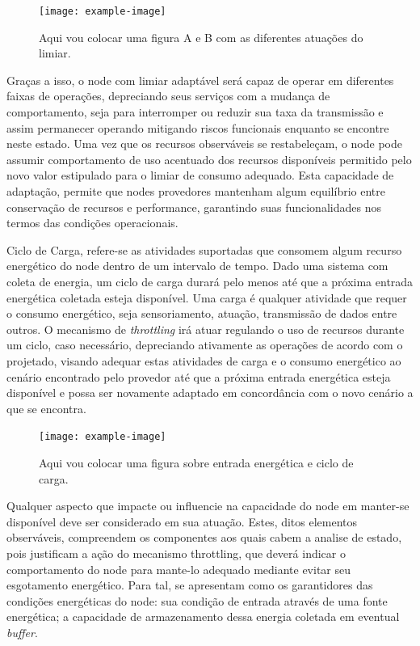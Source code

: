 \begin{itemize}
    \begin{figure}[h]
    	\centering
    	\texttt{[image: example-image]} 
    	\caption{Aqui vou colocar uma figura A e B com as diferentes atuações do limiar.}
    \end{figure}
    
    Graças a isso, o node com limiar adaptável será capaz de operar em diferentes faixas de operações, depreciando seus serviços com a mudança de comportamento, seja para interromper ou reduzir sua taxa da transmissão e assim permanecer operando mitigando riscos funcionais enquanto se encontre neste estado. Uma vez que os recursos observáveis se restabeleçam, o node pode assumir comportamento de uso acentuado dos recursos disponíveis permitido pelo novo valor estipulado para o limiar de consumo adequado. Esta capacidade de adaptação, permite que nodes provedores mantenham algum equilíbrio entre conservação de recursos e performance, garantindo suas funcionalidades nos termos das condições operacionais.
    
      
 
    
\end{itemize}


Ciclo de Carga, refere-se as atividades suportadas que consomem algum recurso energético do node dentro de um intervalo de tempo. Dado uma sistema com coleta de energia, um ciclo de carga durará pelo menos até que a próxima entrada energética coletada esteja disponível.  Uma carga é qualquer atividade que requer o consumo energético, seja sensoriamento, atuação, transmissão de dados entre outros. O mecanismo de \textit{throttling} irá atuar regulando o uso de recursos durante um ciclo, caso necessário, depreciando ativamente as operações de acordo com o projetado, visando adequar estas atividades de carga e o consumo energético ao cenário encontrado pelo provedor até que a próxima entrada energética esteja disponível e possa ser novamente adaptado em concordância com o novo cenário a que se encontra.

\begin{figure}[h]
	\centering
	\noindent\texttt{[image: example-image]} 
	\caption{Aqui vou colocar uma figura sobre entrada energética e ciclo de carga.}
\end{figure}

Qualquer aspecto que impacte ou influencie na capacidade do node em manter-se disponível deve ser considerado em sua atuação. Estes, ditos elementos observáveis, compreendem os componentes aos quais cabem a analise de estado, pois justificam a ação do mecanismo throttling, que deverá indicar o comportamento do node para mante-lo adequado mediante evitar seu esgotamento energético. Para tal, se apresentam como os garantidores das condições energéticas do node: sua condição de entrada através de uma fonte energética; a capacidade de armazenamento dessa energia coletada em eventual \textit{buffer}. 

